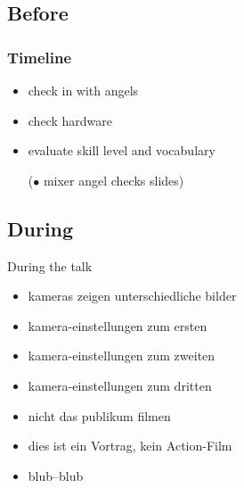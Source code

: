 \documentclass[hyperref={pdfpagelabels=false}]{beamer}
\begin{document}
\subsection{Before}
\begin{frame}
\frametitle{Timeline}
\begin{itemize} %
\item check in with angels %
\item check hardware %
\item evaluate skill level and vocabulary %
\item [($\bullet$] mixer angel checks slides) %
\end{itemize} 
\end{frame}


\subsection{During} %
\begin{frame}{During the talk}
\begin{itemize}
\item  kameras zeigen unterschiedliche bilder 
\item  kamera-einstellungen zum ersten
\item  kamera-einstellungen zum zweiten
\item  kamera-einstellungen zum dritten
\item  nicht das publikum filmen
\item  dies ist ein Vortrag, kein Action-Film 
\item  blub--blub
\end{itemize} 
\end{frame}
\end{document}
